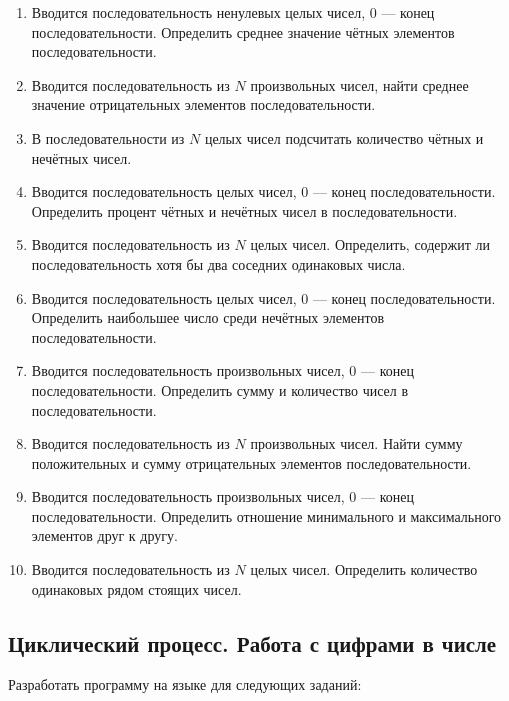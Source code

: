 \begin{enumerate}
\item Вводится последовательность ненулевых целых чисел, 0 --- конец последовательности. Определить среднее значение
чётных элементов последовательности.
\item Вводится последовательность из $N$ произвольных чисел, найти среднее значение отрицательных
элементов последовательности.
\item В последовательности из $N$ целых чисел подсчитать количество чётных и нечётных чисел.
\item Вводится последовательность целых чисел, 0 --- конец последовательности. Определить процент чётных и нечётных чисел
в последовательности.
\item Вводится последовательность из $N$ целых чисел. Определить, содержит ли последовательность хотя
бы два соседних одинаковых числа.
\item Вводится последовательность целых чисел, 0 --- конец последовательности. Определить наибольшее число среди нечётных
элементов последовательности.
\item Вводится последовательность произвольных чисел, 0 --- конец последовательности. Определить сумму и количество чисел
в последовательности.
\item Вводится последовательность из $N$ произвольных чисел. Найти сумму положительных и сумму
отрицательных элементов последовательности.
\item Вводится последовательность произвольных чисел, 0 --- конец последовательности. Определить отношение минимального и
максимального элементов друг к другу.
\item Вводится последовательность из $N$ целых чисел. Определить количество одинаковых рядом стоящих
чисел.
\end{enumerate}

\subsection[Циклический процесс. Работа с цифрами в числе]{Циклический процесс. Работа с цифрами в числе}
Разработать программу на языке  для следующих заданий:

